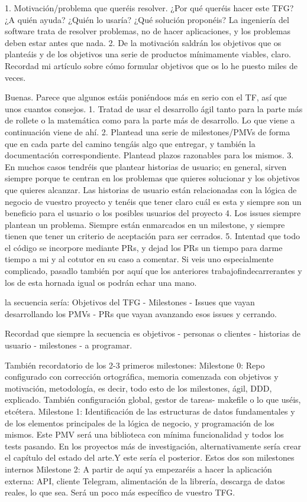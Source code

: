 1. Motivación/problema que queréis resolver. ¿Por qué queréis 
hacer este TFG? ¿A quién ayuda? ¿Quién lo usaría? 
¿Qué solución proponéis? La ingeniería del software 
trata de resolver problemas, no de hacer aplicaciones, 
y los problemas deben estar antes que nada.
2. De la motivación saldrán los objetivos que os planteáis 
y de los objetivos una serie de productos mínimamente viables, claro. 
Recordad mi artículo sobre cómo formular objetivos que os lo 
he puesto miles de veces.

Buenas. Parece que algunos estáis poniéndoos más en serio con el TF, 
así que unos cuantos consejos.
1. Tratad de usar el desarrollo ágil tanto para la parte más de 
rollete o la matemática como para la parte más de desarrollo. 
Lo que viene a continuación viene de ahí.
2. Plantead una serie de milestones/PMVs de forma que en cada 
parte del camino tengáis algo que entregar, y también 
la documentación correspondiente. Plantead plazos razonables para los mismos.
3. En muchos casos tendréis que plantear historias de 
usuario; en general, sirven siempre porque te centran 
en los problemas que quieres solucionar y los objetivos 
que quieres alcanzar. Las historias de usuario están 
relacionadas con la lógica de negocio de vuestro proyecto 
y tenéis que tener claro cuál es esta y siempre son un 
beneficio para el usuario o los posibles usuarios del proyecto
4. Los issues siempre plantean un problema. Siempre están 
enmarcados en un milestone, y siempre tienen que tener un 
criterio de aceptación para ser cerrados. 
5. Intentad que todo el código se incorpore mediante PRs, 
y dejad los PRs un tiempo para darme tiempo a mi y al cotutor en su caso 
a comentar. Si veis uno especialmente complicado, pasadlo 
también por aquí que los anteriores trabajofindecarrerantes 
y los de esta hornada igual os podrán echar una mano.

la secuencia sería:
Objetivos del TFG - Milestones - Issues que vayan desarrollando los PMVs - 
PRs que vayan avanzando esos issues y cerrando.

Recordad que siempre la secuencia es objetivos - personas o clientes -
 historias de usuario - milestones - a programar.

También recordatorio de los 2-3 primeros milestones:
Milestone 0: Repo configurado con corrección ortográfica, 
memoria comenzada con objetivos y motivación, metodología, es decir, 
todo esto de los milestones, ágil, DDD, explicado. 
También configuración global, gestor de tareas- makefile o lo que uséis, 
etcétera.
Milestone 1: Identificación de las estructuras de datos 
fundamentales y de los elementos principales de la 
lógica de negocio, y programación de los mismos. 
Este PMV será una biblioteca con mínima funcionalidad 
y todos los tests pasando. En los proyectos más de 
investigación, alternativamente sería crear el capítulo 
del estado del arte.Y este sería el posterior. Estos dos 
son milestones internos
Milestone 2: A partir de aquí ya empezaréis a hacer la 
aplicación externa: API, cliente Telegram, alimentación 
de la librería, descarga de datos reales, lo que sea. 
Será un poco más específico de vuestro  TFG.

